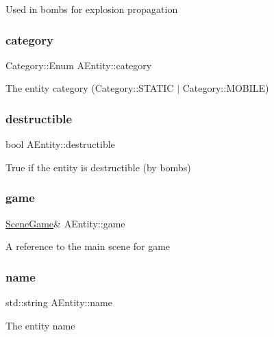 Used in bombs for explosion propagation \mbox{\label{class_a_entity_abc6c4a36aeafe9d30a435fbdac516347}} 
\subsubsection{\texorpdfstring{category}{category}}
{\footnotesize\ttfamily Category\+::\+Enum A\+Entity\+::category}

The entity category (Category\+::\+S\+T\+A\+T\+IC $\vert$ Category\+::\+M\+O\+B\+I\+LE) \mbox{\label{class_a_entity_a09a8ea3c31791230fb95f8c52a12d0b3}} 
\subsubsection{\texorpdfstring{destructible}{destructible}}
{\footnotesize\ttfamily bool A\+Entity\+::destructible}

True if the entity is destructible (by bombs) \mbox{\label{class_a_entity_aa2c05db944a8b7487eb8470dd20211ab}} 
\subsubsection{\texorpdfstring{game}{game}}
{\footnotesize\ttfamily \hyperlink{class_scene_game}{Scene\+Game}\& A\+Entity\+::game}

A reference to the main scene for game \mbox{\label{class_a_entity_a9ebdf8322a0017ff6063f180ef9f037a}} 
\subsubsection{\texorpdfstring{name}{name}}
{\footnotesize\ttfamily std\+::string A\+Entity\+::name}

The entity name \mbox{\label{class_a_entity_acc4f7ad8936089f64c706aa15e86bcea}} 
